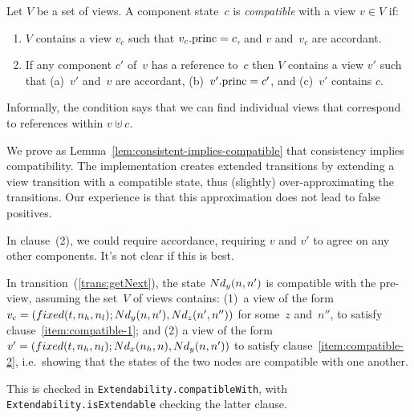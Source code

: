 \begin{definition}
\label{def:compatible}
Let $V$ be a set of views.  A component state~$c$ is \emph{compatible} with a
view $v \in V$ if:
%
\begin{enumerate}
\item\label{item:compatible-1} $V$ contains a view $v_c$ such that
$v_c.\mathrm{princ} = c$,
and $v$ and~$v_c$ are accordant.


\item\label{item:compatible-2} If any component $c'$ of~$v$ has a reference
  to~$c$ then $V$ contains a view $v'$ such that (a)~$v'$ and~$v$ are
  accordant,
  (b)~$v'.\mathrm{princ} = c'$, and (c)~$v'$ contains $c$.
\end{enumerate}
\end{definition}
%
Informally, the condition says that we can find individual views that
correspond to references within $v \uplus c$. 

We prove as
Lemma~\ref{lem:consistent-implies-compatible} that consistency implies
compatibility.  The implementation creates extended transitions by extending a
view transition with a compatible state, thus (slightly) over-approximating
the transitions.  Our experience is that this approximation
does not lead to false positives.

\begin{improve}
In clause~(2), we could require accordance, requiring $v$ and $v'$ to agree on
any other components.  It's not clear if this is best. 
\end{improve}

In transition~(\ref{trans:getNext}), the state $Nd_y(n, n')$ is compatible
with the pre-view, assuming the set~$V$ of views contains: (1)~a view of the
form $v_c = (fixed(t, n_h, n_l);\linebreak[1] \Node_y(n, n'), \linebreak[1]
\Node_z(n', n''))$ for some~$z$ and~$n''$, to satisfy
clause~\ref{item:compatible-1}; and (2) a view of the form $v' = (fixed(t,
n_h, n_l); \Node_x(n_h, n), \linebreak[1] \Node_y(n, n'))$ to satisfy
clause~\ref{item:compatible-2}, i.e.~showing that the states of the two nodes
are compatible with one another.

\begin{impNote}
This is checked in
  \texttt{Extendability.\linebreak[1]compatible\-With}, with
  \texttt{Extendability.isExtendable} checking the latter clause.
\end{impNote}


